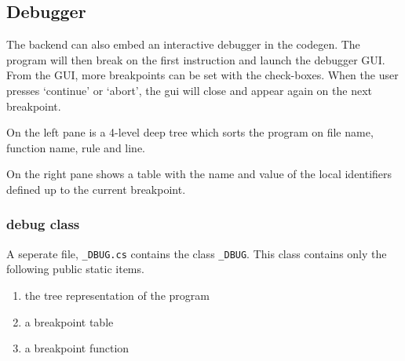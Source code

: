\subsection{Debugger}

The backend can also embed an interactive debugger in the codegen.
The program will then break on the first instruction and launch the debugger GUI.
From the GUI, more breakpoints can be set with the check-boxes.
When the user presses `continue' or `abort', the gui will close and appear again on the next breakpoint.

On the left pane is a 4-level deep tree which sorts the program on file name, function name, rule and line.

On the right pane shows a table with the name and value of the local identifiers defined up to the current breakpoint.

\subsubsection{debug class}

A seperate file, \verb|_DBUG.cs| contains the class \verb|_DBUG|.
This class contains only the following public static items.

\begin{enumerate}
    \item the tree representation of the program
    \item a breakpoint table
    \item a breakpoint function
\end{enumerate}

